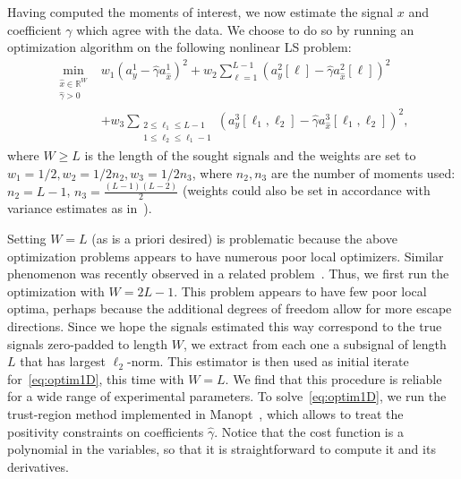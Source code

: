 \documentclass[9pt,twocolumn,twoside,lineno]{pnas-new}
\begin{document}
Having computed the moments of interest, we now estimate the signal $x$ and coefficient $\gamma$ which agree with the data. We choose to do so by running an optimization algorithm on the following nonlinear LS problem:
\begin{align}
\min_{\substack{\hat x\in \mathbb{R}^{W} \\ \hat \gamma > 0}}& w_1 \left( a_y^1 - \hat \gamma a_{\hat x}^1 \right)^2  + w_2 \sum_{\ell = 1}^{L-1} \left( a_y^2[\ell] - \hat \gamma a_{\hat x}^2[\ell] \right)^2  \nonumber \\&+ w_3 \sum_{\substack{2\leq\ell_1\leq L-1 \\ 1 \leq \ell_2 \leq \ell_1-1}} \left( a_y^3[\ell_1, \ell_2] -  \hat \gamma a_{\hat x}^3[\ell_1,\ell_2] \right)^2, 
\label{eq:optim1D}
\end{align}
where $W \geq L$ is the length of the sought signals and the weights are set to $w_1 = 1/2, w_2 = 1/2n_2, w_3 = 1/2n_3$, where $n_2, n_3$ are the number of moments used: $n_2 = L-1$, $n_3 = \frac{(L-1)(L-2)}{2}$ (weights could also be set in accordance with variance estimates as in~\cite{boumal2017heterogeneous}).

Setting $W = L$ (as is a priori desired) is problematic because the above optimization problems appears to have numerous poor local optimizers. Similar phenomenon was recently observed in a related problem~\cite{zhang2018structured}.
Thus, we first run the optimization with $W = 2L-1$. This problem appears to have few poor local optima, perhaps because the additional degrees of freedom allow for more escape directions. Since we hope the signals estimated this way correspond to the true signals zero-padded to length $W$, we extract from each one a subsignal of length $L$ that has largest $\ell_2$-norm. This estimator is then used as initial iterate for~\eqref{eq:optim1D}, this time with $W = L$. We find that this procedure is reliable for a wide range of experimental parameters. To solve~\eqref{eq:optim1D}, we run the trust-region method implemented in Manopt~\cite{manopt}, which allows to treat the positivity constraints on coefficients $\hat \gamma$. Notice that the cost function is a polynomial in the variables, so that it is straightforward to compute it and its derivatives.
\end{document}
